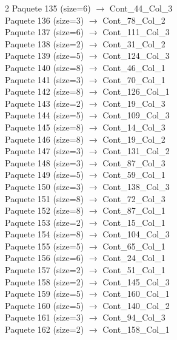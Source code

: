 \begin{multicols}{2}
Paquete 135 (size=6) $\rightarrow$ Cont\_44\_Col\_3\\
Paquete 136 (size=3) $\rightarrow$ Cont\_78\_Col\_2\\
Paquete 137 (size=6) $\rightarrow$ Cont\_111\_Col\_3\\
Paquete 138 (size=2) $\rightarrow$ Cont\_31\_Col\_2\\
Paquete 139 (size=5) $\rightarrow$ Cont\_124\_Col\_3\\
Paquete 140 (size=8) $\rightarrow$ Cont\_46\_Col\_1\\
Paquete 141 (size=3) $\rightarrow$ Cont\_70\_Col\_1\\
Paquete 142 (size=8) $\rightarrow$ Cont\_126\_Col\_1\\
Paquete 143 (size=2) $\rightarrow$ Cont\_19\_Col\_3\\
Paquete 144 (size=5) $\rightarrow$ Cont\_109\_Col\_3\\
Paquete 145 (size=8) $\rightarrow$ Cont\_14\_Col\_3\\
Paquete 146 (size=8) $\rightarrow$ Cont\_19\_Col\_2\\
Paquete 147 (size=3) $\rightarrow$ Cont\_131\_Col\_2\\
Paquete 148 (size=3) $\rightarrow$ Cont\_87\_Col\_3\\
Paquete 149 (size=5) $\rightarrow$ Cont\_59\_Col\_1\\
Paquete 150 (size=3) $\rightarrow$ Cont\_138\_Col\_3\\
Paquete 151 (size=8) $\rightarrow$ Cont\_72\_Col\_3\\
Paquete 152 (size=8) $\rightarrow$ Cont\_87\_Col\_1\\
Paquete 153 (size=2) $\rightarrow$ Cont\_15\_Col\_1\\
Paquete 154 (size=8) $\rightarrow$ Cont\_104\_Col\_3\\
Paquete 155 (size=5) $\rightarrow$ Cont\_65\_Col\_1\\
Paquete 156 (size=6) $\rightarrow$ Cont\_24\_Col\_1\\
Paquete 157 (size=2) $\rightarrow$ Cont\_51\_Col\_1\\
Paquete 158 (size=2) $\rightarrow$ Cont\_145\_Col\_3\\
Paquete 159 (size=5) $\rightarrow$ Cont\_160\_Col\_1\\
Paquete 160 (size=5) $\rightarrow$ Cont\_140\_Col\_2\\
Paquete 161 (size=3) $\rightarrow$ Cont\_94\_Col\_3\\
Paquete 162 (size=2) $\rightarrow$ Cont\_158\_Col\_1\\

\end{multicols}
